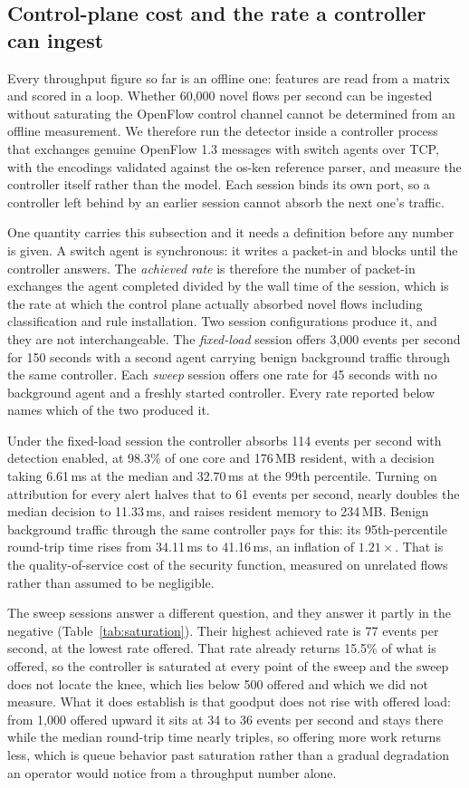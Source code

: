 \documentclass{ieeeaccess}
\begin{document}
\subsection{Control-plane cost and the rate a controller can ingest}
\label{sec:deployment}
Every throughput figure so far is an offline one: features are read from a matrix
and scored in a loop. Whether 60,000 novel flows per second can be ingested without saturating the
OpenFlow control channel cannot be determined from an offline measurement. We therefore run the detector inside a
controller process that exchanges genuine OpenFlow 1.3 messages with switch
agents over TCP, with the encodings validated against the os-ken reference
parser, and measure the controller itself rather than the model. Each session
binds its own port, so a controller left behind by an earlier session cannot
absorb the next one's traffic.

One quantity carries this subsection and it needs a definition before any number
is given. A switch agent is synchronous: it writes a packet-in and blocks until
the controller answers. The \emph{achieved rate} is therefore the number of
packet-in exchanges the agent completed divided by the wall time of the session,
which is the rate at which the control plane actually absorbed novel flows
including classification and rule installation. Two session configurations
produce it, and they are not interchangeable. The \emph{fixed-load} session
offers 3,000 events per second for 150 seconds with a second agent carrying
benign background traffic through the same controller. Each \emph{sweep} session
offers one rate for 45 seconds with no background agent and a freshly started
controller. Every rate reported below names which of the two produced it.

Under the fixed-load session the controller absorbs 114 events per second with
detection enabled, at 98.3\% of one core and 176\,MB resident, with a decision
taking 6.61\,ms at the median and 32.70\,ms at the 99th percentile. Turning on
attribution for every alert halves that to 61 events per second, nearly doubles
the median decision to 11.33\,ms, and raises resident memory to 234\,MB. Benign
background traffic through the same controller pays for this: its
95th-percentile round-trip time rises from 34.11\,ms to 41.16\,ms, an inflation
of $1.21\times$. That is the quality-of-service cost of the security function,
measured on unrelated flows rather than assumed to be negligible.

The sweep sessions answer a different question, and they answer it partly in the
negative (Table~\ref{tab:saturation}). Their highest achieved rate is 77 events
per second, at the lowest rate offered. That rate already returns 15.5\% of what
is offered, so the controller is saturated at every point of the sweep and the
sweep does not locate the knee, which lies below 500 offered and which we did not
measure. What it does establish is that goodput does not rise with offered load:
from 1,000 offered upward it sits at 34 to 36 events per second and stays there
while the median round-trip time nearly triples, so offering more work returns
less, which is queue behavior past saturation rather than a gradual degradation
an operator would notice from a throughput number alone.
\end{document}
